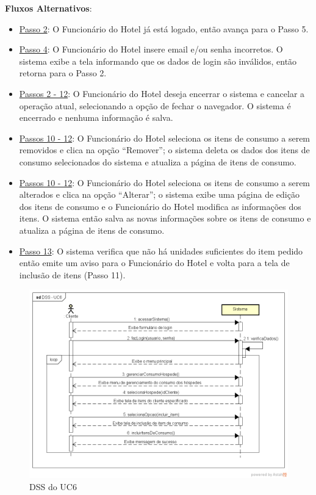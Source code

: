 \documentclass[notitlepage]{article}
\begin{document}
\textbf{Fluxos Alternativos}:\\
\begin{itemize}
\item \underline{Passo 2}: O Funcionário do Hotel já está logado, então avança para o Passo 5.
\item \underline{Passo 4}: O Funcionário do Hotel insere email e/ou senha incorretos. O sistema exibe a tela informando que os dados de login são inválidos, então retorna para o Passo 2.
\item \underline{Passos 2 - 12}: O Funcionário do Hotel deseja encerrar o sistema e cancelar a operação atual, selecionando a opção de fechar o navegador. O sistema é encerrado e nenhuma informação é salva.  
\item \underline{Passos 10 - 12}:  O Funcionário do Hotel seleciona os itens de consumo a serem removidos e clica na opção “Remover”; o sistema deleta os dados dos itens de consumo selecionados do sistema e atualiza a página de itens de consumo. 
\item \underline{Passos 10 - 12}: O Funcionário do Hotel seleciona os itens de consumo a serem alterados e clica na opção “Alterar”; o sistema exibe uma página de edição dos itens de consumo e o Funcionário do Hotel modifica as informações dos itens. O sistema então salva as novas informações sobre os itens de consumo e atualiza a página de itens de consumo.
\item \underline{Passo 13}: O sistema verifica que não há unidades suficientes do item pedido então emite um aviso para o Funcionário do Hotel e volta para a tela de inclusão de itens (Passo 11).

\end{itemize}

\begin{figure}[!htbp]
	\centering
  \includegraphics[scale=0.65]{UC6.png}
  \caption{DSS do UC6}
  \label{fig:UC6}
\end{figure}
\end{document}
